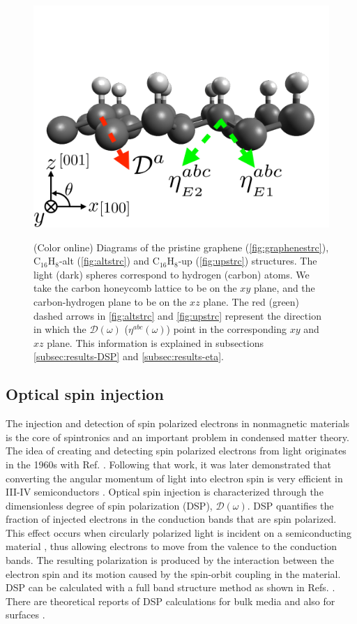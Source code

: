 \documentclass[pss]{wiley2sp} %
\begin{document}
\begin{figure}[t]
{\includegraphics[width=0.49\linewidth]{fig06}
\label{fig:upstrc}}
\caption{(Color online) Diagrams of the pristine graphene 
(\ref{fig:graphenestrc}), C$_{16}$H$_{8}$-alt (\ref{fig:altstrc}) and 
C$_{16}$H$_{8}$-up (\ref{fig:upstrc}) structures. The light (dark) spheres 
correspond to hydrogen (carbon) atoms. We take the carbon honeycomb lattice to 
be on the $xy$ plane, and the carbon-hydrogen plane to be on the $xz$ plane. 
The red (green) dashed arrows in \ref{fig:altstrc} and \ref{fig:upstrc}
represent the direction in which the $\mathcal{D}(\omega)$ ($\eta^{abc}(\omega)$) 
point in the corresponding $xy$ and $xz$ plane. This information is explained 
in subsections \ref{subsec:results-DSP} and \ref{subsec:results-eta}. 
\label{fig:structures}}
\end{figure}


\subsection{Optical spin injection}

The injection and detection of spin polarized electrons in nonmagnetic
materials is the core of spintronics \cite{vzuticRMP04,fertRMP08} and an
important problem in condensed matter theory. The idea of creating and
detecting spin polarized electrons from light originates in the 1960s with
Ref. \cite{lampelPRL68}. Following that work, it was later demonstrated that
converting the angular momentum of light into electron spin is very efficient
in III-IV semiconductors \cite{dyakonovOO84}. Optical spin injection is
characterized through the dimensionless degree of spin polarization (DSP),
$\boldsymbol{\mathcal{D}}(\omega)$. DSP quantifies the fraction of
injected electrons in the conduction bands that are spin polarized. This
effect occurs when circularly polarized light is incident on a semiconducting
material \cite{dyakonovOO84}, thus allowing electrons to move from the valence
to the conduction bands. The resulting polarization is produced by the
interaction between the electron spin and its motion caused by the spin-orbit
coupling in the material. DSP can be calculated with a full band structure
method as shown in Refs. \cite{nastosPRB07,cabellosPRB09}. There are
theoretical reports of DSP calculations for bulk media
\cite{nastosPRB07,cabellosPRB09} and also for surfaces
\cite{mendozaPRB12,arzatePRB14}.
\end{document}
